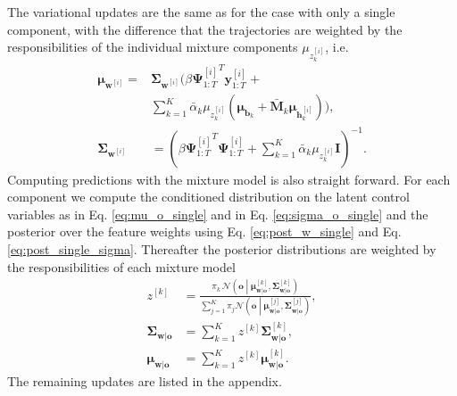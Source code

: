 \documentclass[letterpaper, 10 pt, conference]{ieeeconf}  %
\newcommand{\N}{\ensuremath{\mathcal{N}}}
\renewcommand{\vec}[1]{\ensuremath{\boldsymbol{#1}}}
\newcommand{\Vwi}{\ensuremath{\vec \mu_{\vec {w}^{[i]}} }}
\newcommand{\VSi}{\ensuremath{\boldsymbol{\Sigma}_{\vec{w}^{[i]}} }}
\newcommand{\Vwok}{\ensuremath{\vec \mu_{\vec{b}_k} }}
\newcommand{\VWVk}{\ensuremath{\bar{\vec{M}}_k }}
\newcommand{\Vhik}{\ensuremath{\vec{\mu}_{\vec{h}^{[i]}_k}}}
\newcommand{\ValphaNk}{\ensuremath{\bar{\alpha}_k }}
\newcommand{\Vzik}{\ensuremath{\mu_{z^{[i]}_k}}}
\begin{document}
The variational updates are the same as for the case with only a single component, with 
the  difference that the trajectories are weighted by the responsibilities of the individual mixture components $\Vzik$, i.e.
\begin{align*}
    \Vwi =& \VSi \bigg( \beta {\vec \Psi_{1:T}^{[i]}}^T \vec y_{1:T}^{[i]} + \\
         & \sum_{k=1}^K \ValphaNk \Vzik \left(\Vwok + \VWVk \Vhik \right)\bigg), \\
 \VSi &= \left(\beta {\vec \Psi_{1:T}^{[i]}}^T \vec \Psi_{1:T}^{[i]} +
\sum_{k=1}^K \ValphaNk \Vzik \vec I\right)^{-1}. 
\end{align*}
Computing predictions with the mixture model is also straight forward. 
For each component we compute the conditioned distribution on the latent control variables 
as in Eq. \eqref{eq:mu_o_single} and in Eq. \eqref{eq:sigma_o_single} and 
the posterior over the feature weights using Eq. \eqref{eq:post_w_single} and Eq. \eqref{eq:post_single_sigma}.
Thereafter the posterior distributions are weighted
by the responsibilities of each mixture model   
\begin{align*}
z^{[k]} &= \frac{\pi_k \, \N\left(\vec o\middle|\boldsymbol{{\mu}}_{\vec w |
\vec o}^{[k]}, \boldsymbol{{\Sigma}}_{\vec w |\vec o}^{[k]}\right)}{\sum_{j=1}^K
\pi_j\N\left(\vec o\middle|\boldsymbol{{\mu}}_{\vec w | \vec o}^{[j]},
\boldsymbol{{\Sigma}}_{\vec w |\vec o}^{[j]}\right)}, \\
\boldsymbol{\Sigma}_{\vec w |\vec o} &= \sum_{k=1}^K z^{[k]} \boldsymbol{{\Sigma}}_{\vec w |\vec o}^{[k]}, \\
\boldsymbol{\mu}_{\vec w | \vec o} &= \sum_{k=1}^K z^{[k]} \boldsymbol{{\mu}}_{\vec w | \vec o}^{[k]}. 
\end{align*}
The remaining updates are listed in the appendix. 



\end{document}
